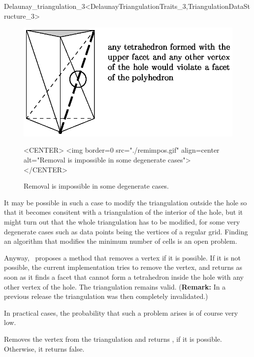 \begin{ccRefClass}{Delaunay_triangulation_3<DelaunayTriangulationTraits_3,TriangulationDataStructure_3>}
\begin{figure}[htbp]
\begin{ccTexOnly}
\begin{center} 
\includegraphics{remimpos.eps} 
\end{center}
\end{ccTexOnly}
\caption{Removal is impossible in some degenerate cases.
\label{Triangulation3-fig-remimpos}}
\begin{ccHtmlOnly}
<CENTER>
<img border=0 src="./remimpos.gif" align=center alt="Removal is impossible in some degenerate cases">
</CENTER>
\end{ccHtmlOnly}
\end{figure} 

It may be possible in such a case to modify the triangulation outside
the hole so that it becomes consitent with a triangulation of the
interior of the hole, but it might turn out that the whole
triangulation has to be modified, for some very degenerate cases such
as data points being the vertices of a regular grid. Finding an
algorithm that modifies the minimum number of cells is an open problem.

Anyway, \cgal\ proposes a method that removes a vertex if it is
possible. If it is not possible, the current implementation tries to
remove the vertex, and returns  as soon as it finds a facet
that cannot form a tetrahedron inside the hole with any other vertex
of the hole. The triangulation remains valid. ({\bf Remark:} In a previous 
release the triangulation was then completely invalidated.) 

In practical cases, the probability that such a problem arises is
of course very low.

{Removes the vertex  from the triangulation and returns
, if it is possible. Otherwise, it returns false.
}


\end{ccRefClass}
